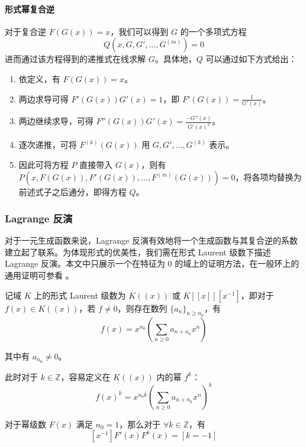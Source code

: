 \paragraph{形式幂复合逆}

对于复合逆 $F(G(x)) =x$，我们可以得到 $G$ 的一个多项式方程
$$Q(x,G,G',\dots,G^{(m)})=0$$
进而通过该方程得到的递推式在线求解 $G$。具体地，$Q$ 可以通过如下方式给出：
\begin{enumerate}
  \item 依定义，有 $F(G(x))=x$。
  \item 两边求导可得 $F'(G(x))G'(x)=1$，即 $F'(G(x))=\frac 1{G'(x)}$。
  \item 两边继续求导，可得 $F''(G(x))G'(x) = \frac{-G''(x)}{G'(x)^2}$。
  \item 逐次递推，可将 $F^{(k)}(G(x))$ 用 $G,G',\dots,G^{(k)}$ 表示。
  \item 因此可将方程 $P$ 直接带入 $G(x)$，则有 $P(x,F(G(x)),F'(G(x)),\dots,F^{(m)}(G(x))) = 0$，将各项均替换为前述式子之后通分，即得方程 $Q$。
\end{enumerate}

\subsubsection{Lagrange 反演}

对于一元生成函数来说，Lagrange 反演有效地将一个生成函数与其复合逆的系数建立起了联系。为体现形式的优美性，我们需在形式 Laurent 级数下描述 Lagrange 反演。本文中只展示一个在特征为 $0$ 的域上的证明方法，在一般环上的通用证明可参看 \cite[Sec. 1.2]{combenum}。

\begin{definition}[形式 Laurent 级数]
记域 $K$ 上的形式 Laurent 级数为 $K((x))$ 或 $K[[x]][x^{-1}]$，即对于 $f(x) \in K((x))$，若 $f\neq 0$，则存在数列 $\{a_n\}_{n\ge n_0}$，有
$$
f(x) = x^{n_0} \left(\sum_{n\ge 0} a_{n+n_0} x^n\right)
$$

其中有 $a_{n_0} \neq 0$。

此时对于 $k\in \mathbb Z$，容易定义在 $K((x))$ 内的幂 $f^k$：
$$
f(x)^k = x^{n_0 k} \left(\sum_{n\ge 0} a_{n+n_0} x^n\right)^k
$$
\end{definition}

\begin{lemma}[形式留数]
对于幂级数 $F(x)$ 满足 $n_0 = 1$，那么对于 $\forall k\in \mathbb Z$，有
$$
[x^{-1}]F'(x)F^k(x)=[k=-1]
$$
\end{lemma}

